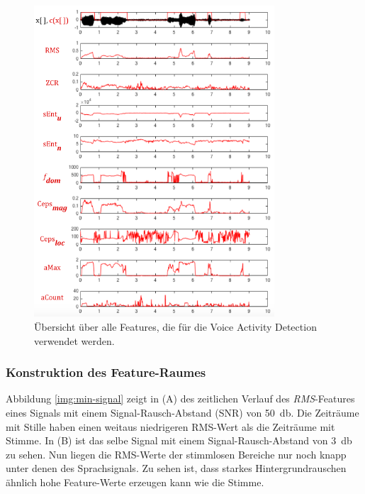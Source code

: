 \begin{figure}[h!]
	\centering
	\includegraphics[width=0.8\textwidth]{bilder/allFeatures01.png}
	\caption{Übersicht über alle Features, die für die Voice Activity Detection verwendet werden.}
	\label{img:vadAllFeatures}
\end{figure}

\subsubsection{Konstruktion des Feature-Raumes}

Abbildung \ref{img:min-signal} zeigt in (A) des zeitlichen Verlauf des \emph{RMS}-Features eines Signals mit einem Signal-Rausch-Abstand (SNR) von \SI{50}{\decibel}. Die Zeiträume mit Stille haben einen weitaus niedrigeren RMS-Wert als die Zeiträume mit Stimme. In (B) ist das selbe Signal mit einem Signal-Rausch-Abstand von \SI{3}{\decibel} zu sehen. Nun liegen die RMS-Werte der stimmlosen Bereiche nur noch knapp unter denen des Sprachsignals. Zu sehen ist, dass starkes Hintergrundrauschen ähnlich hohe Feature-Werte erzeugen kann wie die Stimme.

